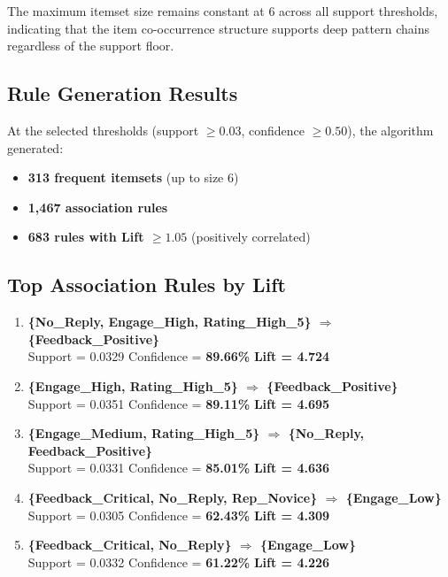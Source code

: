 \documentclass[12pt,a4paper]{article}
\begin{document}
The maximum itemset size remains constant at 6 across all support thresholds, indicating that the item co-occurrence structure supports deep pattern chains regardless of the support floor.

\subsection{Rule Generation Results}

At the selected thresholds (support $\geq 0.03$, confidence $\geq 0.50$), the algorithm generated:
\begin{itemize}[nosep]
    \item \textbf{313 frequent itemsets} (up to size 6)
    \item \textbf{1{,}467 association rules}
    \item \textbf{683 rules with Lift $\geq 1.05$} (positively correlated)
\end{itemize}

\subsection{Top Association Rules by Lift}

\begin{rulebox}
\begin{enumerate}
    \item \textbf{\{No\_Reply, Engage\_High, Rating\_High\_5\} $\Rightarrow$ \{Feedback\_Positive\}}\\
    Support = 0.0329 \quad Confidence = \textbf{89.66\%} \quad \textbf{Lift = 4.724}

    \item \textbf{\{Engage\_High, Rating\_High\_5\} $\Rightarrow$ \{Feedback\_Positive\}}\\
    Support = 0.0351 \quad Confidence = \textbf{89.11\%} \quad \textbf{Lift = 4.695}

    \item \textbf{\{Engage\_Medium, Rating\_High\_5\} $\Rightarrow$ \{No\_Reply, Feedback\_Positive\}}\\
    Support = 0.0331 \quad Confidence = \textbf{85.01\%} \quad \textbf{Lift = 4.636}

    \item \textbf{\{Feedback\_Critical, No\_Reply, Rep\_Novice\} $\Rightarrow$ \{Engage\_Low\}}\\
    Support = 0.0305 \quad Confidence = \textbf{62.43\%} \quad \textbf{Lift = 4.309}

    \item \textbf{\{Feedback\_Critical, No\_Reply\} $\Rightarrow$ \{Engage\_Low\}}\\
    Support = 0.0332 \quad Confidence = \textbf{61.22\%} \quad \textbf{Lift = 4.226}
\end{enumerate}
\end{rulebox}
\end{document}
